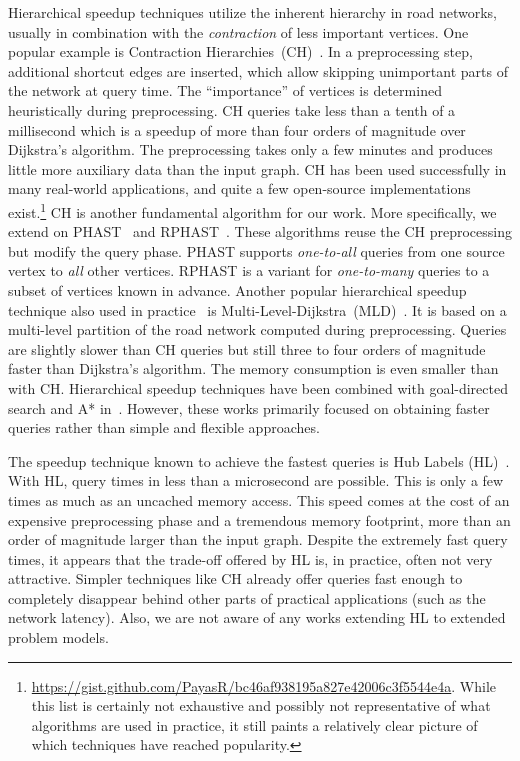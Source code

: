 \documentclass[manuscript,review]{acmart}
\begin{document}
Hierarchical speedup techniques utilize the inherent hierarchy in road networks, usually in combination with the \emph{contraction} of less important vertices.
One popular example is Contraction Hierarchies~(CH)~\cite{gssv-erlrn-12}.
In a preprocessing step, additional shortcut edges are inserted, which allow skipping unimportant parts of the network at query time.
The ``importance'' of vertices is determined heuristically during preprocessing.
CH queries take less than a tenth of a millisecond which is a speedup of more than four orders of magnitude over Dijkstra's algorithm.
The preprocessing takes only a few minutes and produces little more auxiliary data than the input graph.
CH has been used successfully in many real-world applications, and quite a few open-source implementations exist.\footnote{
\url{https://gist.github.com/PayasR/bc46af938195a827e42006c3f5544e4a}.
While this list is certainly not exhaustive and possibly not representative of what algorithms are used in practice, it still paints a relatively clear picture of which techniques have reached popularity.
}
CH is another fundamental algorithm for our work.
More specifically, we extend on PHAST~\cite{dgnw-phast-13} and RPHAST~\cite{delling_et_al:OASIcs:2011:3266}.
These algorithms reuse the CH preprocessing but modify the query phase.
PHAST supports \emph{one-to-all} queries from one source vertex to \emph{all} other vertices.
RPHAST is a variant for \emph{one-to-many} queries to a subset of vertices known in advance.
%
Another popular hierarchical speedup technique also used in practice~\cite{bingblog} is Multi-Level-Dijkstra~(MLD)~\cite{swz-umlgt-02}.
It is based on a multi-level partition of the road network computed during preprocessing.
Queries are slightly slower than CH queries but still three to four orders of magnitude faster than Dijkstra's algorithm.
The memory consumption is even smaller than with CH.
Hierarchical speedup techniques have been combined with goal-directed search and A* in~\cite{bdsssw-chgds-10,gkw-blwr-07,bdgwz-sfpcs-19}.
However, these works primarily focused on obtaining faster queries rather than simple and flexible approaches.

The speedup technique known to achieve the fastest queries is Hub Labels (HL)~\cite{DBLP:conf/esa/AbrahamDGW12,DBLP:conf/wea/DellingGW13}.
With HL, query times in less than a microsecond are possible.
This is only a few times as much as an uncached memory access.
This speed comes at the cost of an expensive preprocessing phase and a tremendous memory footprint, more than an order of magnitude larger than the input graph.
Despite the extremely fast query times, it appears that the trade-off offered by HL is, in practice, often not very attractive.
Simpler techniques like CH already offer queries fast enough to completely disappear behind other parts of practical applications (such as the network latency).
Also, we are not aware of any works extending HL to extended problem models.
\end{document}
